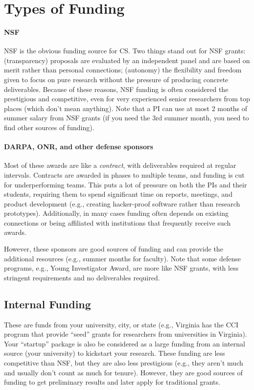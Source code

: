 \documentclass[oneside,11pt,dvipsnames]{book}
\begin{document}
\section{Types of Funding}
\paragraph{NSF} NSF is the obvious funding source for CS. 
Two things stand out for NSF grants: (transparency) proposals are evaluated by an independent panel and are based on merit rather than personal connections; (autonomy) the flexibility and freedom given to focus on pure research without the pressure of producing concrete deliverables.  Because of these reasons, NSF funding is often considered the prestigious and competitive, even for very experienced senior researchers from top places (which don't mean anything). Note that a PI can use at most 2 months of summer salary from NSF grants (if you need the 3rd summer month, you need to find other sources of funding).

\paragraph{DARPA, ONR, and other defense sponsors} Most of these awards are like a \emph{contract}, with deliverables required at regular intervals. Contracts are awarded in phases to multiple teams, and funding is cut for underperforming teams. This puts a lot of pressure on both the PIs and their students, requiring them to spend significant time on reports, meetings, and product development (e.g., creating hacker-proof software rather than research prototypes). Additionally, in many cases funding often depends on existing connections or being affiliated with institutions that frequently receive such awards.

However, these sponsors are good sources of funding and can provide the additional resources (e.g., summer months for faculty). Note that some defense programs, e.g., Young Investigator Award, are more like NSF grants, with less stringent requirements and no deliverables required. 


\subsection{Internal Funding}
These are funds from your university, city, or state (e.g., Virginia has the CCI program that provide ``seed'' grants for researchers from universities in Virginia).  Your ``startup'' package is also be considered as a large funding from an internal source (your university) to kickstart your research. These funding are less competitive than NSF, but they are also less prestigious (e.g., they aren't much and usually don't count as much for tenure).  However, they are good sources of funding to get preliminary results and later apply for traditional grants.
\end{document}
